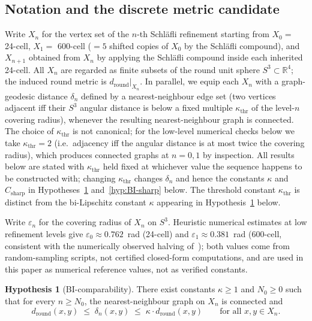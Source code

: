 \documentclass[12pt]{article}
\theoremstyle{definition}
\newtheorem{hypothesis}[theorem]{Hypothesis}
\theoremstyle{remark}
\begin{document}
\subsection{Notation and the discrete metric candidate}

Write $X_n$ for the vertex set of the $n$-th Schl\"afli refinement starting from $X_0 = $ 24-cell, $X_1 = $ 600-cell ($= 5$ shifted copies of $X_0$ by the Schl\"afli compound), and $X_{n+1}$ obtained from $X_n$ by applying the Schl\"afli compound inside each inherited 24-cell. All $X_n$ are regarded as finite subsets of the round unit sphere $S^3 \subset \mathbb{R}^4$; the induced round metric is $d_{\mathrm{round}}|_{X_n}$. In parallel, we equip each $X_n$ with a graph-geodesic distance $\delta_n$ defined by a nearest-neighbour edge set (two vertices adjacent iff their $S^3$ angular distance is below a fixed multiple $\kappa_{\mathrm{thr}}$ of the level-$n$ covering radius), whenever the resulting nearest-neighbour graph is connected. The choice of $\kappa_{\mathrm{thr}}$ is not canonical; for the low-level numerical checks below we take $\kappa_{\mathrm{thr}} = 2$ (i.e.\ adjacency iff the angular distance is at most twice the covering radius), which produces connected graphs at $n = 0, 1$ by inspection. All results below are stated with $\kappa_{\mathrm{thr}}$ held fixed at whichever value the sequence happens to be constructed with; changing $\kappa_{\mathrm{thr}}$ changes $\delta_n$ and hence the constants $\kappa$ and $C_{\mathrm{sharp}}$ in Hypotheses~\ref{hyp:BI} and~\ref{hyp:BI-sharp} below. The threshold constant $\kappa_{\mathrm{thr}}$ is distinct from the bi-Lipschitz constant $\kappa$ appearing in Hypothesis~\ref{hyp:BI} below.

Write $\varepsilon_n$ for the covering radius of $X_n$ on $S^3$. Heuristic numerical estimates at low refinement levels give $\varepsilon_0 \approx 0.762$~rad (24-cell) and $\varepsilon_1 \approx 0.381$~rad (600-cell, consistent with the numerically observed halving of~\citep{SmartXXXVI}); both values come from random-sampling scripts, not certified closed-form computations, and are used in this paper as numerical reference values, not as verified constants.

\begin{hypothesis}[BI-comparability]\label{hyp:BI}
There exist constants $\kappa \geq 1$ and $N_0 \geq 0$ such that for every $n \geq N_0$, the nearest-neighbour graph on $X_n$ is connected and
\[
    d_{\mathrm{round}}(x, y) \;\leq\; \delta_n(x, y) \;\leq\; \kappa \cdot d_{\mathrm{round}}(x, y) \qquad \text{for all } x, y \in X_n.
\]
\end{hypothesis}
\end{document}
